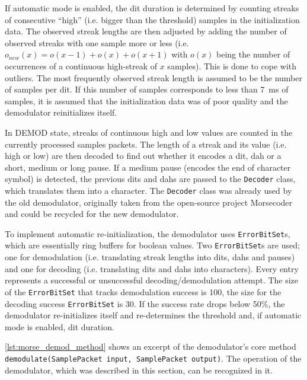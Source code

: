 If automatic mode is enabled, the dit duration is determined by counting streaks of consecutive ``high'' (i.e. bigger than the threshold) samples in the initialization data. The observed streak lengths are then adjusted by adding the number of observed streaks with one sample more or less (i.e. $o_{new}(x) = o(x-1) + o(x)+ o(x+1)$ with $o(x)$ being the number of occurrences of a continuous high-streak of $x$ samples). This is done to cope with outliers. The most frequently observed streak length is assumed to be the number of samples per dit. If this number of samples corresponds to less than \SI{7}{\milli\second} of samples, it is assumed that the initialization data was of poor quality and the demodulator reinitializes itself.

In DEMOD state, streaks of continuous high and low values are counted in the currently processed samples packets. The length of a streak and its value (i.e. high or low) are then decoded to find out whether it encodes a dit, dah or a short, medium or long pause. If a medium pause (encodes the end of character symbol) is detected, the previous dits and dahs are passed to the \texttt{Decoder} class, which translates them into a character. The \texttt{Decoder} class was already used by the old demodulator, originally taken from the open-source project Morsecoder and could be recycled for the new demodulator.

To implement automatic re-initialization, the demodulator uses \texttt{ErrorBitSet}s, which are essentially ring buffers for boolean values. Two \texttt{ErrorBitSet}s are used; one for demodulation (i.e. translating streak lengths into dits, dahs and pauses) and one for decoding (i.e. translating dits and dahs into characters). Every entry represents a successful or unsuccessful decoding/demodulation attempt. The size of the \texttt{ErrorBitSet} that tracks demodulation success is 100, the size for the decoding success \texttt{ErrorBitSet} is 30. If the success rate drops below 50\%, the demodulator re-initializes itself and re-determines the threshold and, if automatic mode is enabled, dit duration.


\autoref{lst:morse_demod_method} shows an excerpt of the demodulator's core method \texttt{demodulate(SamplePacket input, SamplePacket output)}. The operation of the demodulator, which was described in this section, can be recognized in it.

